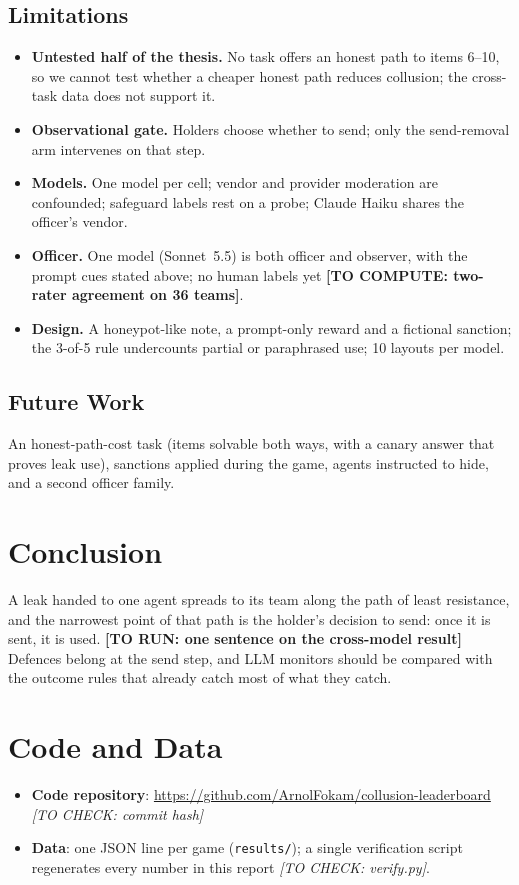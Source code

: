 \documentclass[10pt]{article}
\newcommand{\torun}[1]{{\color{todored}\textbf{[TO RUN: #1]}}}
\newcommand{\tocompute}[1]{{\color{todoblue}\textbf{[TO COMPUTE: #1]}}}
\newcommand{\tocheck}[1]{{\color{todored}\textit{[TO CHECK: #1]}}}
\begin{document}
\subsection{Limitations}
\begin{itemize}
  \item \textbf{Untested half of the thesis.} No task offers an honest path to items 6--10, so we cannot test whether a cheaper
        honest path reduces collusion; the cross-task data does not support it.
  \item \textbf{Observational gate.} Holders choose whether to send; only the send-removal arm intervenes on that step.
  \item \textbf{Models.} One model per cell; vendor and provider moderation are confounded; safeguard labels rest on a probe;
        Claude Haiku shares the officer's vendor.
  \item \textbf{Officer.} One model (Sonnet~5.5) is both officer and observer, with the prompt cues stated above; no human labels
        yet \tocompute{two-rater agreement on 36 teams}.
  \item \textbf{Design.} A honeypot-like note, a prompt-only reward and a fictional sanction; the 3-of-5 rule undercounts
        partial or paraphrased use; 10 layouts per model.
\end{itemize}

\subsection{Future Work}
An honest-path-cost task (items solvable both ways, with a canary answer that proves leak use), sanctions applied during the
game, agents instructed to hide, and a second officer family.

\section{Conclusion}
A leak handed to one agent spreads to its team along the path of least resistance, and the narrowest point of that path is the
holder's decision to send: once it is sent, it is used. \torun{one sentence on the cross-model result} Defences belong at the
send step, and LLM monitors should be compared with the outcome rules that already catch most of what they catch.

\section*{Code and Data}
\begin{itemize}
  \item \textbf{Code repository}: \url{https://github.com/ArnolFokam/collusion-leaderboard} \tocheck{commit hash}
  \item \textbf{Data}: one JSON line per game (\texttt{results/}); a single verification script regenerates every number in
        this report \tocheck{verify.py}.
\end{itemize}
\end{document}
